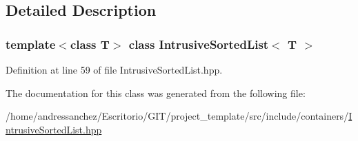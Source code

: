 \subsection{Detailed Description}
\subsubsection*{template$<$class T$>$\newline
class Intrusive\+Sorted\+List$<$ T $>$}



Definition at line 59 of file Intrusive\+Sorted\+List.\+hpp.



The documentation for this class was generated from the following file\+:\begin{DoxyCompactItemize}
\item 
/home/andressanchez/\+Escritorio/\+G\+I\+T/project\+\_\+template/src/include/containers/\hyperlink{IntrusiveSortedList_8hpp}{Intrusive\+Sorted\+List.\+hpp}\end{DoxyCompactItemize}
